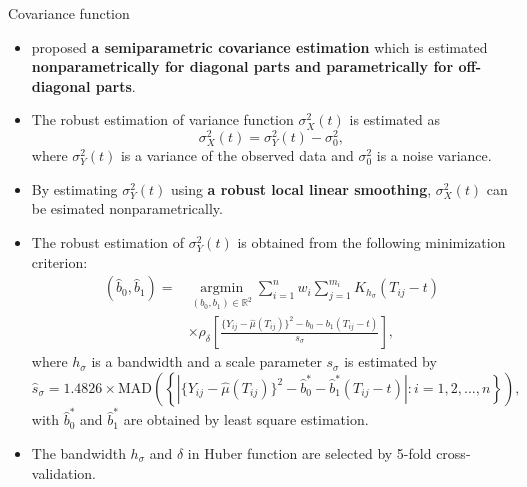 \documentclass[9pt]{beamer}
\begin{document}
\begin{frame}[allowframebreaks]{Covariance function}
	\begin{itemize}
		\item{
			\cite{Lin2020} proposed \textbf{a semiparametric covariance estimation} which is estimated \textbf{nonparametrically for diagonal parts and parametrically for off-diagonal parts}.
		}
		\item{
			The robust estimation of variance function $\sigma^2_X(t)$ is estimated as
			$$
			\sigma^2_X(t) = \sigma^2_Y(t) - \sigma^2_0 ,
			$$
			where $\sigma^2_Y(t)$ is a variance of the observed data and $\sigma^2_0$ is a noise variance.
		}
		\item{
			By estimating $\sigma^2_Y(t)$ using \textbf{a robust local linear smoothing}, $\sigma^2_X(t)$ can be esimated nonparametrically.
		}
		
	
		\pagebreak
		\item{
			The robust estimation of $\sigma^2_Y(t)$ is obtained from the following minimization criterion:
			\begin{align*}
			( \hat b_0 , \hat b_1) =& \underset{(b_0,b_1) \in \mathbb{R}^2}{\operatorname{\arg\min}} \sum_{i=1}^n w_i \sum_{j=1}^{m_i} K_{h_\sigma} (T_{ij} -t) \\
								    &\times \rho_\delta \left[ \frac{ \{Y_{ij} - \hat \mu(T_{ij})\}^2 -b_0-  b_1 (T_{ij} -t) }{s_{\sigma}} \right], 
			\end{align*}
			where $h_{\sigma}$ is a bandwidth and a scale parameter $s_\sigma$ is estimated by 
			$$ \hat s_{\sigma} = 1.4826 \times \text{MAD}\left( \left\{ |\{Y_{ij} - \hat \mu(T_{ij})\}^2 - \hat{b}_0^{*} - \hat{b}_1^{*} (T_{ij} -t)| : i=1,2,\dots,n \right\} \right) , $$
			with $\hat{b}_0^{*}$ and $\hat{b}_1^{*}$ are obtained by least square estimation.
		}
		\item{
			The bandwidth $h_{\sigma}$ and $\delta$ in Huber function are selected by 5-fold cross-validation.
		}
		

\end{itemize}
\end{frame}
\end{document}
